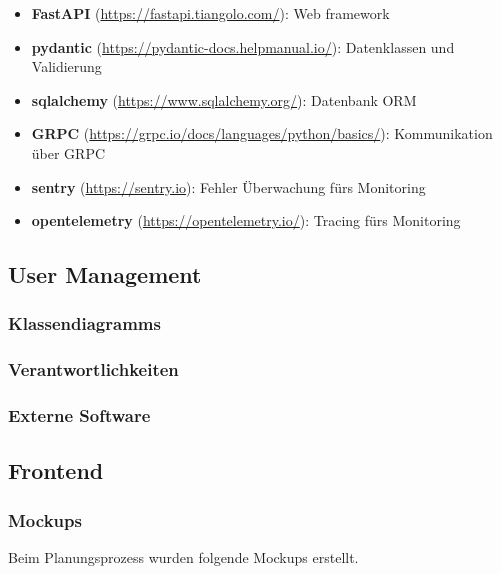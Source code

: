 \begin{itemize}
    \item \textbf{FastAPI} (\href{https://fastapi.tiangolo.com/}{https://fastapi.tiangolo.com/}): Web framework
    \item \textbf{pydantic} (\href{https://pydantic-docs.helpmanual.io/}{https://pydantic-docs.helpmanual.io/}): Datenklassen und Validierung
    \item \textbf{sqlalchemy} (\href{https://www.sqlalchemy.org/}{https://www.sqlalchemy.org/}): Datenbank ORM
    \item \textbf{GRPC} (\href{https://grpc.io/docs/languages/python/basics/}{https://grpc.io/docs/languages/python/basics/}): Kommunikation über GRPC
    \item \textbf{sentry} (\href{https://sentry.io}{https://sentry.io}): Fehler Überwachung fürs Monitoring
    \item \textbf{opentelemetry} (\href{https://opentelemetry.io/}{https://opentelemetry.io/}): Tracing fürs Monitoring
\end{itemize}

\subsection{User Management}
\subsubsection{Klassendiagramms}
\subsubsection{Verantwortlichkeiten}
\subsubsection{Externe Software}

\newpage

\subsection{Frontend}

\subsubsection{Mockups}

Beim Planungsprozess wurden folgende Mockups erstellt.


